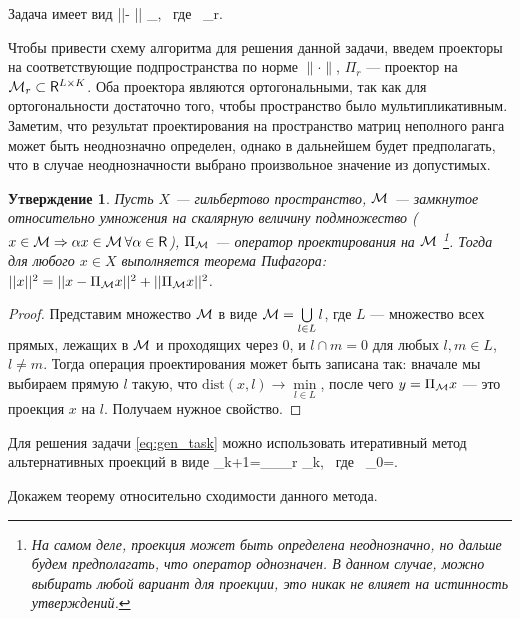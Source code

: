 \documentclass[12pt,a4paper,fleqn,leqno]{article}
\newtheorem{proposition}{Утверждение}%
\begin{document}
Задача имеет вид
\be
\label{eq:gen_task}
||\bfX - \bfY|| \to \min_\bfY, \mbox{\ где\ } \bfY \in \calH \cap \calM_r.
\ee

Чтобы привести схему алгоритма для решения данной задачи, введем проекторы на соответствующие подпространства
по норме $\|\cdot\|$, $\Pi_r$ --- проектор на $\mathcal{M}_r\subset \mathsf{R}^{L\times K}$. Оба проектора являются ортогональными,
так как для ортогональности достаточно того, чтобы пространство было мультипликативным. Заметим, что результат проектирования
на пространство матриц неполного ранга может быть неоднозначно определен, однако в дальнейшем будет предполагать, что
в случае неоднозначности выбрано произвольное значение из допустимых.

\begin{proposition} \label{pythaprop}
Пусть $X$ --- гильбертово пространство, $\mathcal{M}$ --- замкнутое относительно умножения на скалярную величину подмножество ($x \in \mathcal{M} \Rightarrow \alpha x \in \mathcal{M} \, \forall \alpha \in \mathsf{R}$), $\Pi_{\mathcal{M}}$ --- оператор проектирования на $\mathcal{M}$ \footnote{На самом деле, проекция может быть определена неоднозначно, но дальше будем предполагать, что оператор однозначен. В данном случае, можно выбирать любой вариант для проекции, это никак не влияет на истинность утверждений.}. Тогда для любого $x \in X$ выполняется теорема Пифагора: $||x||^2 = ||x - \Pi_{\mathcal{M}} x||^2 + ||\Pi_{\mathcal{M}} x||^2$.
\end{proposition}
\begin{proof}
Представим множество $\mathcal{M}$ в виде $\mathcal{M} = \bigcup\limits_{l \in L}l$, где $L$ --- множество всех прямых, лежащих в $\mathcal{M}$ и проходящих через $0$, и $l \cap m = 0$ для любых $l, m \in L$, $l \neq m$. Тогда операция проектирования может быть записана так: вначале мы выбираем прямую $l$ такую, что $\text{dist}(x, l) \rightarrow \min\limits_{l \in L}$, после чего $y = \Pi_{\mathcal{M}} x$ --- это проекция $x$ на $l$. Получаем нужное свойство.
\end{proof}

Для решения задачи \eqref{eq:gen_task} можно использовать итеративный метод альтернативных проекций в виде
\be
   \bfY_{k+1}=\Pi_\calH \Pi_{\calM_r} \bfY_{k}, \mbox{\ где\ } \bfY_{0}=\bfX.
\ee

Докажем теорему относительно сходимости данного метода.
\end{document}
